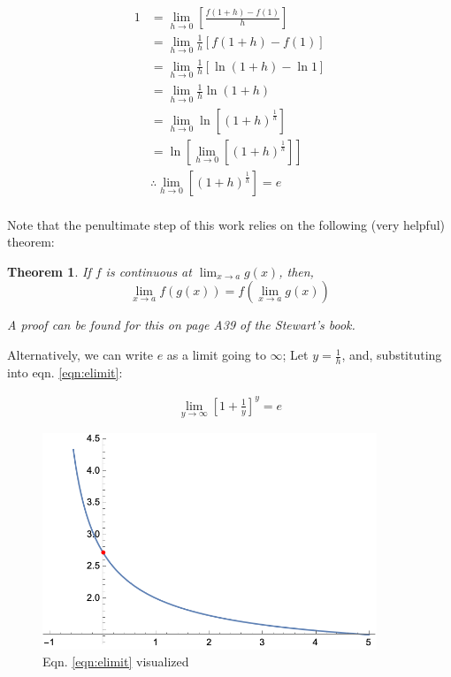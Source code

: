 \documentclass[12pt]{article}
\newtheorem{theorem}{Theorem}
\begin{document}
\begin{equation}\label{eqn:elimit}
    \begin{split}
        1 &= \lim_{h \to 0}[\frac{f(1+h) - f(1)}{h}]\\
        &= \lim_{h\to 0}\frac{1}{h}[f(1+h)-f(1)]\\
        &= \lim_{h\to 0} \frac{1}{h}[\ln (1+h) - \ln 1]\\
        &= \lim_{h\to 0} \frac{1}{h} \ln(1+h)\\
        &= \lim_{h\to 0} \ln[(1+h)^{\frac{1}{h}}]\\
        &= \ln[\lim_{h\to 0}[(1+h)^{\frac{1}{h}}]]\\
        &\therefore \lim_{h\to 0}[(1+h)^{\frac{1}{h}}] = e\\
    \end{split}
\end{equation}

Note that the penultimate step of this work relies on the following (very helpful) theorem:

\begin{theorem}
    If $f$ is continuous at $\lim_{x\to a} g(x)$, then,
    $$\lim_{x\to a} f(g(x)) = f(\lim_{x\to a} g(x))$$

    \textit{A proof can be found for this on page A39 of the Stewart's book.}
\end{theorem}


Alternatively, we can write $e$ as a limit going to $\infty$; Let $y = \frac{1}{h}$, and, substituting into eqn. \ref{eqn:elimit}:

\begin{equation}
    \begin{split}
        \lim_{y\to\infty}[1+\frac{1}{y}]^y = e
    \end{split}
\end{equation}

\begin{figure}
    \centering
    \includegraphics[width=10.0cm]{misc/easalimit.png}
    \caption{Eqn. \ref{eqn:elimit} visualized}
\end{figure}
\end{document}
